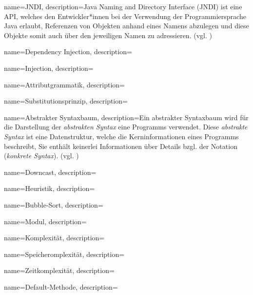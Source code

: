 {
    name=JNDI,
    description={Java Naming and Directory Interface (JNDI) ist eine API, welches den Entwickler*innen bei der Verwendung der Programmiersprache Java erlaubt, Referenzen von Objekten anhand eines Namens abzulegen und diese Objekte somit auch über den jeweiligen Namen zu adressieren. (vgl. \cite{jndi})}
}

{
    name=Dependency Injection,
    description={}
}

{
    name=Injection,
    description={}
}

{
    name=Attributgrammatik,
    description={}
}

{
    name=Substitutionsprinzip,
    description={}
}



{
    name=Abstrakter Syntaxbaum,
    description={Ein abstrakter Syntaxbaum wird für die Darstellung der \emph{abstrakten Syntax} eine Programms verwendet. Diese \emph{abstrakte Syntax} ist eine Datenstruktur, welche die Kerninformationen eines Programms beschreibt, Sie enthält keinerlei Informationen über Details bzgl. der Notation (\emph{konkrete Syntax}). (vgl. \cite{dsl})}
}

{
    name=Downcast,
    description={}
}

{
    name=Heuristik,
    description={}
}

{
    name=Bubble-Sort,
    description={}
}

{
    name=Modul,
    description={}
}

{
    name=Komplexität,
    description={}
}


{
    name=Speicheromplexität,
    description={}
}


{
    name=Zeitkomplexität,
    description={}
}

{
    name=Default-Methode,
    description={}
}
